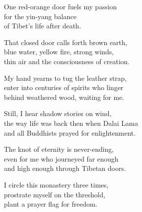 \documentclass[twoside,10pt]{book}
\begin{document}
One red-orange door fuels my passion\\
for the yin-yang balance\\
of Tibet's life after death.

That closed door calls forth brown earth,\\
blue water, yellow fire, strong winds,\\
thin air and the consciousness of creation.

My hand yearns to tug the leather strap,\\
enter into centuries of spirits who linger\\
behind weathered wood, waiting for me.

Still, I hear shadow stories on wind,\\
the way life was back then when Dalai Lama\\
and all Buddhists prayed for enlightenment.

The knot of eternity is never-ending,\\
even for me who journeyed far enough\\
and high enough through Tibetan doors.

I circle this monastery three times,\\
prostrate myself on the threshold,\\
plant a prayer flag for freedom.

\clearpage
\pagestyle{empty}
\cleardoublepage
\mbox{ }

\clearpage

\mbox{ }
\end{document}
